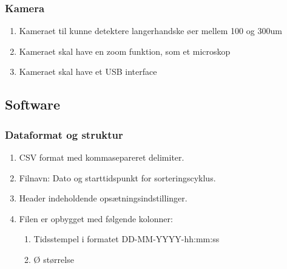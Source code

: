 \subsubsection{Kamera}
\begin{enumerate}
\item Kameraet til kunne detektere langerhandske øer mellem 100 og 300um
\item Kameraet skal have en zoom funktion, som et microskop
\item Kameraet skal have et USB interface
\end{enumerate}


\subsection{Software}

\subsubsection{Dataformat og struktur}
\begin{enumerate}
\item CSV format med kommasepareret delimiter. 
\item Filnavn: Dato og starttidspunkt for sorteringscyklus.
\item Header indeholdende opsætningsindstillinger.
\item Filen er opbygget med følgende kolonner: 
\begin{enumerate}
\item Tidsstempel i formatet DD-MM-YYYY-hh:mm:ss
\item Ø størrelse
\end{enumerate}
\end{enumerate}

